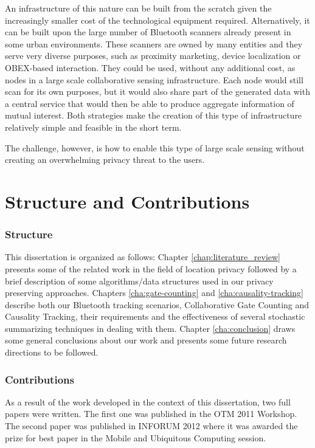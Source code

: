 An infrastructure of this nature can be built from the scratch given
the increasingly smaller cost of the technological equipment required.
Alternatively, it can be built upon the large number of Bluetooth
scanners already present in some urban environments. These scanners
are owned by many entities and they serve very diverse purposes, such
as proximity marketing, device localization or OBEX-based interaction.
They could be used, without any additional cost, as nodes in a large
scale collaborative sensing infrastructure. Each node would still scan
for its own purposes, but it would also share part of the generated
data with a central service that would then be able to produce
aggregate information of mutual interest. Both strategies make the
creation of this type of infrastructure relatively simple and feasible
in the short term.

The challenge, however, is how to enable this type of large scale
sensing without creating an overwhelming privacy threat to the users.


\section{Structure and Contributions}
\label{sec:structure}

\subsubsection{Structure}
\label{sec:structure} This dissertation is organized as follows:
Chapter \ref{chap:literature_review} presents some of the related work
in the field of location privacy followed by a brief description of
some algorithms/data structures used in our privacy preserving
approaches. Chapters \ref{cha:gate-counting} and
\ref{cha:causality-tracking} describe both our Bluetooth tracking
scenarios, Collaborative Gate Counting and Causality Tracking, their
requirements and the effectiveness of several stochastic summarizing
techniques in dealing with them. Chapter \ref{cha:conclusion} draws
some general conclusions about our work and presents some future
research directions to be followed.

\subsubsection{Contributions}
\label{sec:contributions}
As a result of the work developed in the context of this dissertation,
two full papers were written. The first one
\cite{gonccalves2011privacy} was published in the OTM 2011 Workshop.
The second paper \cite{inforum2012} was published in INFORUM 2012
where it was awarded the prize for best paper in the Mobile and
Ubiquitous Computing session.

